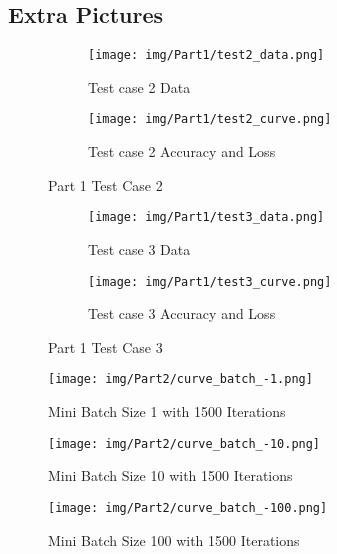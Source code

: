 \begin{appendix}

  \section{Extra Pictures}

  \begin{figure}[!ht]
    \centering
    \begin{subfigure}[b]{0.5\textwidth}
      \texttt{[image: img/Part1/test2\_data.png]}
      \caption{Test case 2 Data}
    \end{subfigure}
    \begin{subfigure}[b]{1\textwidth}
      \texttt{[image: img/Part1/test2\_curve.png]}
      \caption{Test case 2 Accuracy and Loss}
    \end{subfigure}
    \caption{Part 1 Test Case 2}
    \label{fig:p1test2}
  \end{figure}

  \begin{figure}[!ht]
    \centering
    \begin{subfigure}[b]{0.5\textwidth}
      \texttt{[image: img/Part1/test3\_data.png]}
      \caption{Test case 3 Data}
    \end{subfigure}
    \begin{subfigure}[b]{1\textwidth}
      \texttt{[image: img/Part1/test3\_curve.png]}
      \caption{Test case 3 Accuracy and Loss}
    \end{subfigure}
    \caption{Part 1 Test Case 3}
    \label{fig:p1test3}
  \end{figure}

  \begin{figure}[!htbp]
    \centering
    \texttt{[image: img/Part2/curve\_batch\_-1.png]}
    \caption{Mini Batch Size 1 with 1500 Iterations}
    \label{fig:p2batch-1}
  \end{figure}


  \begin{figure}[!htbp]
    \centering
    \texttt{[image: img/Part2/curve\_batch\_-10.png]}
    \caption{Mini Batch Size 10 with 1500 Iterations}
    \label{fig:p2batch-10}
  \end{figure}


  \begin{figure}[!htbp]
    \centering
    \texttt{[image: img/Part2/curve\_batch\_-100.png]}
    \caption{Mini Batch Size 100 with 1500 Iterations}
    \label{fig:p2batch-100}
  \end{figure}


\end{appendix}
